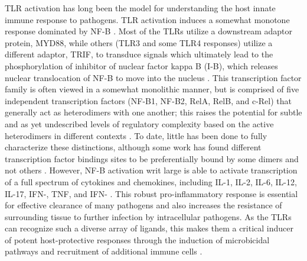 TLR activation has long been the model for understanding the host innate immune response to pathogens. TLR activation induces a somewhat monotone response dominated by NF-\textkappa B \citep{Arbibe2000, Kawai2007, Brandt2013}. Most of the TLRs utilize a downstream adaptor protein, MYD88, while others (TLR3 and some TLR4 responses) utilize a different adaptor, TRIF, to transduce signals which ultimately lead to the phosphorylation of inhibitor of nuclear factor kappa B (I-\textkappa B), which releases nuclear translocation of NF-\textkappa B to move into the nucleus \citep{Wright1990, Triantafilou2002, Kawai1999, Yamamoto2003, Akira2004, Kawasaki2014, Takeda2004}. This transcription factor family is often viewed in a somewhat monolithic manner, but is comprised of five independent transcription factors (NF-\textkappa B1, NF-\textkappa B2, RelA, RelB, and c-Rel) that generally act as heterodimers with one another; this raises the potential for subtle and as yet undescribed levels of regulatory complexity based on the active heterodimers in different contexts \citep{Baeuerle1994, Finco1995, Rice1992, Oeckinghaus2009, Ghosh2012, Albensi2019, Liu2017}. To date, little has been done to fully characterize these distinctions, although some work has found different transcription factor bindings sites to be preferentially bound by some dimers and not others \citep{Siggers2012, Ramsey2019, Florio2022}. However, NF-\textkappa B activation writ large is able to activate transcription of a full spectrum of cytokines and chemokines, including IL-1\textbeta, IL-2, IL-6, IL-12, IL-17, IFN-\textbeta, TNF\textalpha, and IFN-\textgamma{} \citep{Pahl1999, Liu2017}. This robust pro-inflammatory response is essential for effective clearance of many pathogens and also increases the resistance of surrounding tissue to further infection by intracellular pathogens. As the TLRs can recognize such a diverse array of ligands, this makes them a critical inducer of potent host-protective responses through the induction of microbicidal pathways and recruitment of additional immune cells \citep{Kawai2007, Kawasaki2014}. 

